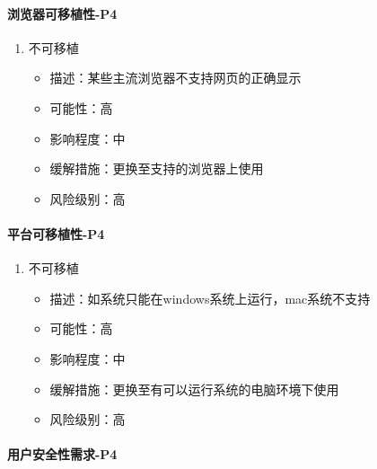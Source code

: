\documentclass[hyperref, a4paper]{ctexart}
\providecommand{\tightlist}{%
  \setlength{\itemsep}{0pt}\setlength{\parskip}{0pt}}
\let\oldparagraph\paragraph
\renewcommand{\paragraph}[1]{\oldparagraph{#1}\mbox{}}
\begin{document}
\hypertarget{ux6d4fux89c8ux5668ux53efux79fbux690dux6027-p4}{%
\paragraph{浏览器可移植性-P4}\label{ux6d4fux89c8ux5668ux53efux79fbux690dux6027-p4}}

\begin{enumerate}
\def\labelenumi{\arabic{enumi}.}
\tightlist
\item
  不可移植

  \begin{itemize}
  \tightlist
  \item
    描述：某些主流浏览器不支持网页的正确显示
  \item
    可能性：高
  \item
    影响程度：中
  \item
    缓解措施：更换至支持的浏览器上使用
  \item
    风险级别：高
  \end{itemize}
\end{enumerate}

\hypertarget{ux5e73ux53f0ux53efux79fbux690dux6027-p4}{%
\paragraph{平台可移植性-P4}\label{ux5e73ux53f0ux53efux79fbux690dux6027-p4}}

\begin{enumerate}
\def\labelenumi{\arabic{enumi}.}
\tightlist
\item
  不可移植

  \begin{itemize}
  \tightlist
  \item
    描述：如系统只能在windows系统上运行，mac系统不支持
  \item
    可能性：高
  \item
    影响程度：中
  \item
    缓解措施：更换至有可以运行系统的电脑环境下使用
  \item
    风险级别：高
  \end{itemize}
\end{enumerate}

\hypertarget{ux7528ux6237ux5b89ux5168ux6027ux9700ux6c42-p4}{%
\paragraph{用户安全性需求-P4}\label{ux7528ux6237ux5b89ux5168ux6027ux9700ux6c42-p4}}
\end{document}

